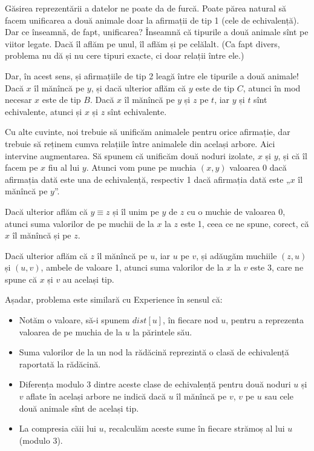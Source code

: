 \documentclass[../main.tex]{subfiles}
\begin{document}
Găsirea reprezentării a datelor ne poate da de furcă. Poate părea natural să facem unificarea a două animale doar la afirmații de tip 1 (cele de echivalență). Dar ce înseamnă, de fapt, unificarea? Înseamnă că tipurile a două animale sînt pe viitor legate. Dacă îl aflăm pe unul, îl aflăm și pe celălalt. (Ca fapt divers, problema nu dă și nu cere tipuri exacte, ci doar relații între ele.)

Dar, în acest sens, și afirmațiile de tip 2 leagă între ele tipurile a două animale! Dacă $x$ îl mănîncă pe $y$, și dacă ulterior aflăm că $y$ este de tip $C$, atunci în mod necesar $x$ este de tip $B$. Dacă $x$ îl mănîncă pe $y$ și $z$ pe $t$, iar $y$ și $t$ sînt echivalente, atunci și $x$ și $z$ sînt echivalente.

Cu alte cuvinte, noi trebuie să unificăm animalele pentru orice afirmație, dar trebuie să reținem cumva relațiile între animalele din același arbore. Aici intervine augmentarea. Să spunem că unificăm două noduri izolate, $x$ și $y$, și că îl facem pe $x$ fiu al lui $y$. Atunci vom pune pe muchia $(x, y)$ valoarea 0 dacă afirmația dată este una de echivalență, respectiv 1 dacă afirmația dată este „$x$ îl mănîncă pe $y$”.

Dacă ulterior aflăm că $y \equiv z$ și îl unim pe $y$ de $z$ cu o muchie de valoarea 0, atunci suma valorilor de pe muchii de la $x$ la $z$ este 1, ceea ce ne spune, corect, că $x$ îl mănîncă și pe $z$.

Dacă ulterior aflăm că $z$ îl mănîncă pe $u$, iar $u$ pe $v$, și adăugăm muchiile $(z, u)$ și $(u, v)$, ambele de valoare 1, atunci suma valorilor de la $x$ la $v$ este 3, care ne spune că $x$ și $v$ au același tip.

Așadar, problema este similară cu Experience în sensul că:

\begin{itemize}
  \item Notăm o valoare, să-i spunem $dist[u]$, în fiecare nod $u$, pentru a reprezenta valoarea de pe muchia de la $u$ la părintele său.
  \item Suma valorilor de la un nod la rădăcină reprezintă o clasă de echivalență raportată la rădăcină.
  \item Diferența modulo 3 dintre aceste clase de echivalență pentru două noduri $u$ și $v$ aflate în același arbore ne indică dacă $u$ îl mănîncă pe $v$, $v$ pe $u$ sau cele două animale sînt de același tip.
  \item La compresia căii lui $u$, recalculăm aceste sume în fiecare strămoș al lui $u$ (modulo 3).
\end{itemize}
\end{document}
